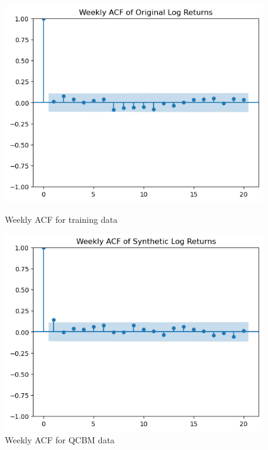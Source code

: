 \documentclass[12pt]{article}
\numberwithin{equation}{section}
\begin{document}
\begin{figure}[h!]
    \centering
    \begin{minipage}{0.48\textwidth}
        \centering
        \includegraphics[width=\linewidth]{weeklyacfog.png}
        \caption{Weekly ACF for training data}
        \label{fig:compdists}
    \end{minipage}
    \hfill
    \begin{minipage}{0.48\textwidth}
        \centering
        \includegraphics[width=\linewidth]{weeklyacfqcbm.png}
        \caption{Weekly ACF for QCBM data}
        \label{fig:pricepath}
    \end{minipage}
\end{figure}
\end{document}
